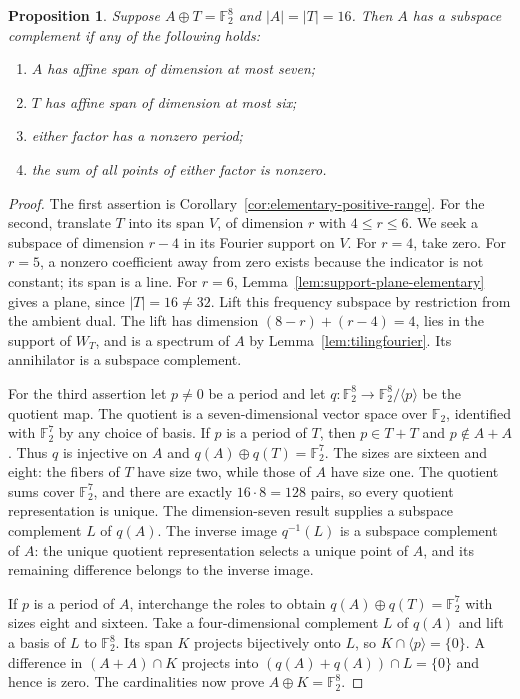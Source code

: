 \documentclass[11pt]{article}
\numberwithin{equation}{section}
\newtheorem{proposition}[theorem]{Proposition}
\theoremstyle{definition}
\theoremstyle{remark}\newtheorem{remark}[theorem]{Remark}
\newcommand{\F}{\mathbb F_2}
\begin{document}
\begin{proposition}\label{prop:16reductions}
Suppose $A\oplus T=\F^8$ and $|A|=|T|=16$. Then $A$ has a subspace
complement if any of the following holds:
\begin{enumerate}
\item $A$ has affine span of dimension at most seven;
\item $T$ has affine span of dimension at most six;
\item either factor has a nonzero period;
\item the sum of all points of either factor is nonzero.
\end{enumerate}
\end{proposition}
\begin{proof}
The first assertion is Corollary~\ref{cor:elementary-positive-range}.
For the second, translate $T$ into its span $V$, of dimension $r$ with
$4\le r\le6$. We seek a subspace of dimension $r-4$ in its Fourier
support on $V$. For $r=4$, take zero. For $r=5$, a nonzero coefficient
away from zero exists because the indicator is not constant; its span
is a line. For $r=6$, Lemma~\ref{lem:support-plane-elementary} gives a
plane, since $|T|=16\ne32$. Lift this frequency subspace by restriction
from the ambient dual. The lift has dimension $(8-r)+(r-4)=4$, lies
in the support of $W_T$, and is a spectrum of $A$ by
Lemma~\ref{lem:tilingfourier}. Its annihilator is a subspace complement.

For the third assertion let $p\ne0$ be a period and let
$q:\F^8\to\F^8/\langle p\rangle$ be the quotient map. The quotient
is a seven-dimensional vector space over $\F$, identified with $\F^7$
by any choice of basis. If $p$ is a period of $T$, then $p\in T+T$
and $p\notin A+A$. Thus $q$ is injective on $A$ and
$q(A)\oplus q(T)=\F^7$. The sizes are sixteen and eight: the fibers
of $T$ have size two, while those of $A$ have size one. The quotient
sums cover $\F^7$, and there are exactly $16\cdot8=128$ pairs, so
every quotient representation is unique. The dimension-seven
result supplies a subspace complement $L$ of $q(A)$. The inverse image
$q^{-1}(L)$ is a subspace complement of $A$: the unique quotient
representation selects a unique point of $A$, and its remaining difference
belongs to the inverse image.

If $p$ is a period of $A$, interchange the roles to obtain
$q(A)\oplus q(T)=\F^7$ with sizes eight and sixteen. Take a
four-dimensional complement $L$ of $q(A)$ and lift a basis of $L$
to $\F^8$. Its span $K$ projects bijectively onto $L$, so
$K\cap\langle p\rangle=\{0\}$. A difference in $(A+A)\cap K$
projects into $(q(A)+q(A))\cap L=\{0\}$ and hence is zero.
The cardinalities now prove $A\oplus K=\F^8$.


\end{proof}
\end{document}
